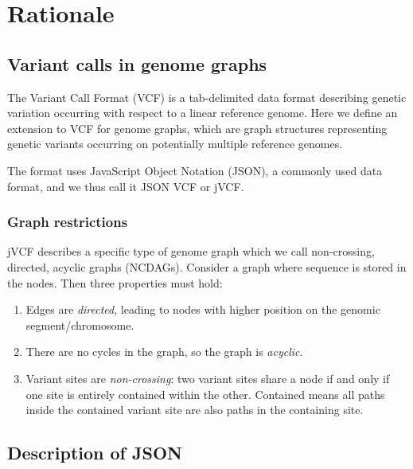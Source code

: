 \newpage

\hypertarget{rationale}{%
\section{Rationale}\label{rationale}}

\hypertarget{variant-calls-in-genome-graphs}{%
\subsection{Variant calls in genome
graphs}\label{variant-calls-in-genome-graphs}}

The Variant Call Format (VCF) is a tab-delimited data format describing
genetic variation occurring with respect to a linear reference genome.
Here we define an extension to VCF for genome graphs, which are graph
structures representing genetic variants occurring on potentially
multiple reference genomes.

The format uses JavaScript Object Notation (JSON), a commonly used data
format, and we thus call it JSON VCF or jVCF.

\hypertarget{graph-restrictions}{%
\subsubsection{Graph restrictions}\label{graph-restrictions}}

jVCF describes a specific type of genome graph which we call
non-crossing, directed, acyclic graphs (NCDAGs). Consider a graph where
sequence is stored in the nodes. Then three properties must hold:

\begin{enumerate}
\def\labelenumi{\arabic{enumi}.}
\tightlist
\item
  Edges are \emph{directed}, leading to nodes with higher position on
  the genomic segment/chromosome.
\item
  There are no cycles in the graph, so the graph is \emph{acyclic}.
\item
  Variant sites are \emph{non-crossing}: two variant sites share a node
  if and only if one site is entirely contained within the other.
  Contained means all paths inside the contained variant site are also
  paths in the containing site.
\end{enumerate}

\hypertarget{description-of-json}{%
\subsection{Description of JSON}\label{description-of-json}}


